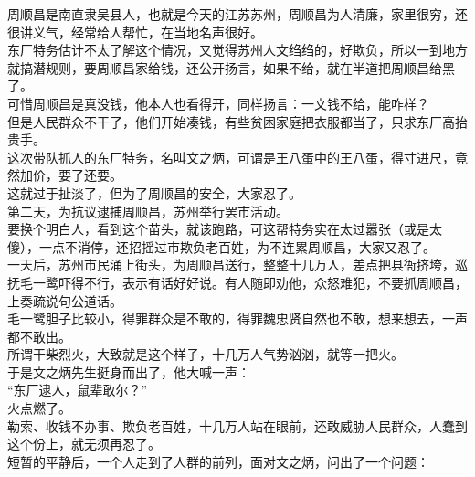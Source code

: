 \begin{multicols}{\theparacolNo}
周顺昌是南直隶吴县人，也就是今天的江苏苏州，周顺昌为人清廉，家里很穷，还很讲义气，经常给人帮忙，在当地名声很好。\\

东厂特务估计不太了解这个情况，又觉得苏州人文绉绉的，好欺负，所以一到地方就搞潜规则，要周顺昌家给钱，还公开扬言，如果不给，就在半道把周顺昌给黑了。\\

可惜周顺昌是真没钱，他本人也看得开，同样扬言：一文钱不给，能咋样？\\

但是人民群众不干了，他们开始凑钱，有些贫困家庭把衣服都当了，只求东厂高抬贵手。\\

这次带队抓人的东厂特务，名叫文之炳，可谓是王八蛋中的王八蛋，得寸进尺，竟然加价，要了还要。\\

这就过于扯淡了，但为了周顺昌的安全，大家忍了。\\

第二天，为抗议逮捕周顺昌，苏州举行罢市活动。\\

要换个明白人，看到这个苗头，就该跑路，可这帮特务实在太过嚣张（或是太傻），一点不消停，还招摇过市欺负老百姓，为不连累周顺昌，大家又忍了。\\

一天后，苏州市民涌上街头，为周顺昌送行，整整十几万人，差点把县衙挤垮，巡抚毛一鹭吓得不行，表示有话好好说。有人随即劝他，众怒难犯，不要抓周顺昌，上奏疏说句公道话。\\

毛一鹭胆子比较小，得罪群众是不敢的，得罪魏忠贤自然也不敢，想来想去，一声都不敢出。\\

所谓干柴烈火，大致就是这个样子，十几万人气势汹汹，就等一把火。\\

于是文之炳先生挺身而出了，他大喊一声：\\

“东厂逮人，鼠辈敢尔？”\\

火点燃了。\\

勒索、收钱不办事、欺负老百姓，十几万人站在眼前，还敢威胁人民群众，人蠢到这个份上，就无须再忍了。\\

短暂的平静后，一个人走到了人群的前列，面对文之炳，问出了一个问题：\\


\end{multicols}
